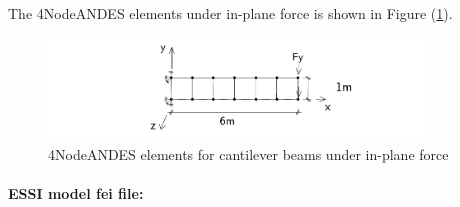 \begin{lstlisting}

\end{lstlisting}

The 4NodeANDES elements under in-plane force is shown in Figure (\ref{fig 4NodeANDES elements for cantilever beams under inplane force}).

\begin{figure}[!htb]
  \centering
  \vskip 8pt
    \centering
    \includegraphics[width=10cm]{./Figure-files/_Chapter_Appendix_Illustrative_Examples/beam_ANDES_yz_inPlane_6div.pdf}
  \caption{4NodeANDES elements for cantilever beams under in-plane force}
  \label{fig 4NodeANDES elements for cantilever beams under inplane force}
\end{figure}


\paragraph{ESSI model fei file: } ~

